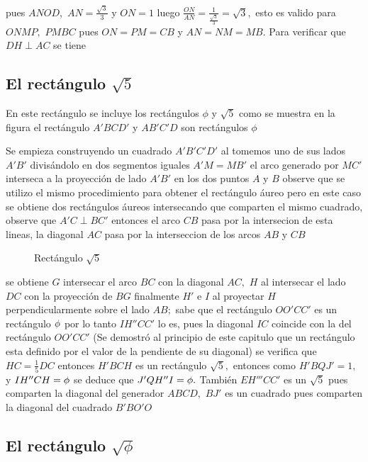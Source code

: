 pues $ANOD,$ $AN=\frac{\sqrt{3}}{3}$ y $ON=1$ luego $\frac{ON}{AN}=\frac{1}{\frac{\sqrt{3}}{3}}=\sqrt{3},$ esto es valido para $ONMP,$ $PMBC$ pues $ON=PM=CB$ y $AN=NM=MB.$ Para verificar que $DH\perp AC$ se tiene

\subsection{El rectángulo $\sqrt{5}$}

En este rectángulo se incluye los rectángulos $\phi$ y $\sqrt{5}$  como se muestra en la figura el rectángulo $A'BCD'$ y $AB'C'D$ son rectángulos $\phi$

Se empieza construyendo un cuadrado $A'B'C'D'$ al tomemos uno de sus lados $A'B'$ divisándolo en dos segmentos iguales $A'M=MB'$ el arco generado por $MC'$ interseca a la proyección de lado $A'B'$ en los dos puntos $A$ y $B$ observe que se utilizo el mismo procedimiento para obtener el rectángulo áureo pero en este caso se obtiene dos rectángulos áureos intersecando que comparten el mismo cuadrado, observe que $A'C\perp BC'$ entonces el arco $CB$ pasa por la intersecion de esta lineas, la diagonal $AC$ pasa por la interseccion de los arcos $AB$ y $CB$

\begin{figure}[!ht]
	\begin{center}

\end{center}
	\caption{Rectángulo $\sqrt{5}$}\label{Uw}
\end{figure}
se obtiene $G$ intersecar el arco $BC$ con la diagonal $AC,$ $H$ al intersecar el lado $DC$ con la proyección de $BG$ finalmente $H'$ e $I$ al proyectar $H$ perpendicularmente sobre el lado $AB;$  sabe que el rectángulo $OO'CC'$ es un rectángulo $\phi$ por lo tanto $IH''CC'$ lo es, pues la diagonal $IC$ coincide con la del rectángulo $OO'CC'$ (Se demostró al principio de este capitulo que un rectángulo esta definido por el valor de la pendiente de su diagonal) se verifica que $HC=\frac{1}{5}DC$ entonces $H'BCH$ es un rectángulo $\sqrt{5},$ entonces como $H'BQJ'=1,$ y $IH''CH=\phi$  se deduce que $J'QH''I=\phi.$ También $EH'''CC'$ es un $\sqrt{5}$ pues comparten la diagonal del generador $ABCD,$ $BJ'$ es un cuadrado pues comparten la diagonal del cuadrado $B'BO'O$

\subsection{El rectángulo $\sqrt{\phi}$}

